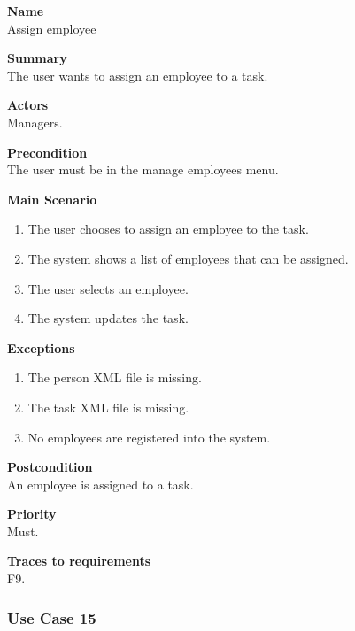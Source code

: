 \documentclass[12pt]{article}
\begin{document}
\noindent
{\bf Name}\\
Assign employee

\noindent
{\bf Summary}\\
The user wants to assign an employee to a task.

\noindent
{\bf Actors}\\
Managers.

\noindent
{\bf Precondition}\\
The user must be in the manage employees menu.

\noindent
{\bf Main Scenario}\\
\vspace*{-0.35in}
\begin{enumerate}
\item The user chooses to assign an employee to the task.
\vspace*{-0.1in}
\item The system shows a list of employees that can be assigned.
\vspace*{-0.1in}
\item The user selects an employee.
\vspace*{-0.1in}
\item The system updates the task.
\end{enumerate}
\vspace*{-0.1in}

\noindent
{\bf Exceptions}\\
\vspace*{-0.35in}
\begin{enumerate}
\item The person XML file is missing.
\vspace*{-0.1in}
\item The task XML file is missing.
\vspace*{-0.1in}
\item No employees are registered into the system.
\end{enumerate}
\vspace*{-0.1in}

\noindent
{\bf Postcondition}\\
An employee is assigned to a task.

\noindent
{\bf Priority}\\
Must.

\noindent
{\bf Traces to requirements}\\
F9.

\subsubsection{Use Case 15} \label{uc:15}
\end{document}
